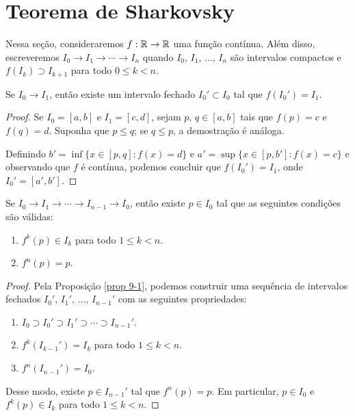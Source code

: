 \section{Teorema de Sharkovsky}

Nessa seção, consideraremos $f: \mathbb{R} \to \mathbb{R}$ uma função contínua.
Além disso, escreveremos $I_0 \longrightarrow I_1 \longrightarrow \cdots \longrightarrow I_n$ quando $I_0, \, I_1, \, \dots, \, I_n$ são intervalos compactos e $f(I_k) \supset I_{k+1}$ para todo $0 \leq k < n$.

\begin{proposition}\label{prop 9-1}
Se $I_0 \longrightarrow I_1$, então existe um intervalo fechado $I_0' \subset I_0$ tal que $f(I_0') = I_1$.
\end{proposition}

\begin{proof}
Se $I_0 = [a, b]$ e $I_1 = [c, d]$, sejam $p, \, q \in [a, b]$ tais que $f(p) = c$ e $f(q) = d$.
Suponha que $p \leq q$; se $q \leq p$, a demostração é análoga.

Definindo $b' = \inf \lbrace x \in [p, q] : f(x) = d \rbrace$ e $a' = \sup \lbrace x \in [p, b'] : f(x) = c \rbrace$ e observando que $f$ é contínua, podemos concluir que $f(I_0') = I_1$, onde $I_0' = [a', b']$.
\end{proof}

\begin{lemma}
Se $I_0 \longrightarrow I_1 \longrightarrow \cdots \longrightarrow I_{n-1} \longrightarrow I_0$, então existe $p \in I_0$ tal que as seguintes condições são válidas:
\begin{enumerate}
\item $f^k(p) \in I_k$ para todo $1 \leq k < n$.
\item $f^n(p) = p$.
\end{enumerate}
\end{lemma}

\begin{proof}
Pela Proposição \ref{prop 9-1}, podemos construir uma sequência de intervalos fechados $I_0', \, I_1', \, \dots, \, I_{n-1}'$ com as seguintes propriedades:
\begin{enumerate}[label=\alph*)]
\item $I_0 \supset I_0' \supset I_1' \supset \cdots \supset I_{n-1}'$.
\item $f^k(I_{k-1}') = I_k$ para todo $1 \leq k < n$.
\item $f^n(I_{n-1}') = I_0$.
\end{enumerate}

Desse modo, existe $p \in I_{n-1}'$ tal que $f^n(p) = p$.
Em particular, $p \in I_0$ e $f^k(p) \in I_k$ para todo $1 \leq k < n$.
\end{proof}

